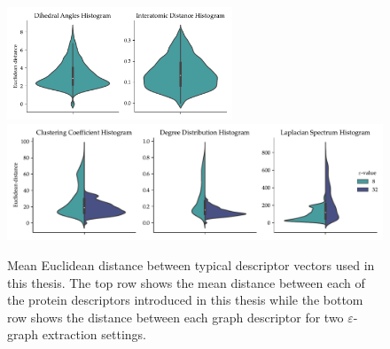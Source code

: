 \begin{figure}
  \centering
  \includegraphics[width=0.6\textwidth]{./figures/results/violin_protein_descriptors.pdf}
  \includegraphics[width=\textwidth]{./figures/results/violin_graph_descriptors.pdf}
  \caption[Mean Euclidean distance between typical descriptor vectors used in
  this thesis]{Mean Euclidean distance between typical descriptor vectors used in
this thesis. The top row shows the mean distance between each of the protein
descriptors introduced in this thesis while the bottom row shows the distance
between each graph descriptor for two $\varepsilon$-graph extraction settings.}
  \label{fig:mean_distance_embedding}
\end{figure}
